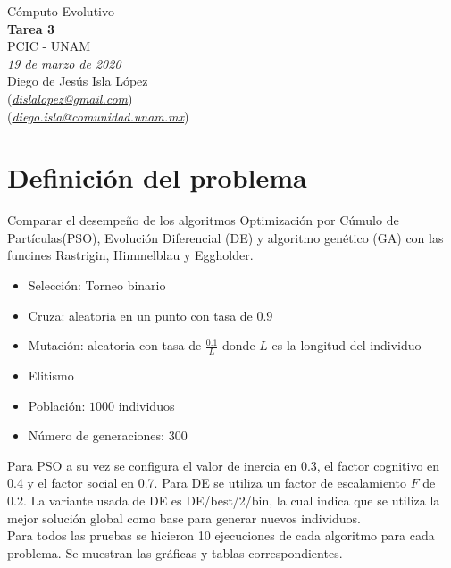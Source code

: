 \documentclass[letterpaper,12pt]{article}
\theoremstyle{definition}
\begin{document}
\begin{center}
  {\large Cómputo Evolutivo}\\
  \vspace{0.2cm}
  {\large\bfseries Tarea 3}\\
  \vspace{0.2cm}
  {\large PCIC - UNAM}\\
  \vspace{0.5cm}
  {\itshape 19 de marzo de 2020}\\
  \vspace{0.5cm}
  Diego de Jesús Isla López\\
  (\href{mailto:dislalopez@gmail.com}{\itshape dislalopez@gmail.com})\\
  (\href{mailto:diego.isla@comunidad.unam.mx}{\itshape diego.isla@comunidad.unam.mx})\\
\end{center}



\section{Definición del problema}

Comparar el desempeño de los algoritmos Optimización por Cúmulo de Partículas(PSO), Evolución Diferencial (DE) y algoritmo genético (GA) con las funcines Rastrigin, Himmelblau y Eggholder.\\

\begin{itemize}
  \item Selección: Torneo binario
  \item Cruza: aleatoria en un punto con tasa de \(0.9\)
  \item Mutación: aleatoria con tasa de \(\frac{0.1}{L}\) donde \(L\) es la longitud del individuo
  \item Elitismo
  \item Población: \(1000\) individuos
  \item Número de generaciones: \(300\)
\end{itemize}

\medskip
Para PSO a su vez se configura el valor de inercia en 0.3, el factor cognitivo en 0.4 y el factor social en 0.7. Para DE se utiliza un factor de escalamiento \(F\) de 0.2. La variante usada de DE es DE/best/2/bin, la cual indica que se utiliza la mejor solución global como base para generar nuevos individuos.\\

Para todos las pruebas se hicieron 10 ejecuciones de cada algoritmo para cada problema. Se muestran las gráficas y tablas correspondientes.
\end{document}
